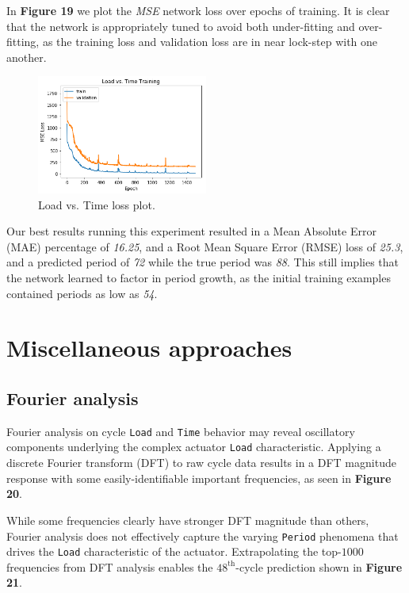 \documentclass[letterpaper, 10 pt, conference]{ieeeconf}  %
\begin{document}
In \textbf{Figure 19} we plot the \textit{MSE} network loss over epochs of training. It is clear that the network is appropriately tuned to avoid both under-fitting and over-fitting, as the training loss and validation loss are in near lock-step with one another.

\label{LoadTimeTraining}
\begin{figure}[!h]
	\centering
	\includegraphics[width=0.5\textwidth]{assets/loadtime_training_plot.png}
    \caption{Load vs. Time loss plot.}
\end{figure}


Our best results running this experiment resulted in a Mean Absolute Error (MAE) percentage of \textit{16.25}, and a Root Mean Square Error (RMSE) loss of \textit{25.3}, and a predicted period of \textit{72} while the true period was \textit{88}. This still implies that the network learned to factor in period growth, as the initial training examples contained periods as low as \textit{54}.



\section{Miscellaneous approaches}
\subsection{Fourier analysis}
Fourier analysis on cycle \verb|Load| and \verb|Time| behavior may reveal oscillatory components underlying the complex actuator \verb|Load| characteristic. Applying a discrete Fourier transform (DFT) to raw cycle data results in a DFT magnitude response with some easily-identifiable important frequencies, as seen in \textbf{Figure 20}.

While some frequencies clearly have stronger DFT magnitude than others, Fourier analysis does not effectively capture the varying \verb|Period| phenomena that drives the \verb|Load| characteristic of the actuator. Extrapolating the top-$1000$ frequencies from DFT analysis enables the $48^{\text{th}}$-cycle prediction shown in \textbf{Figure 21}.
\end{document}
